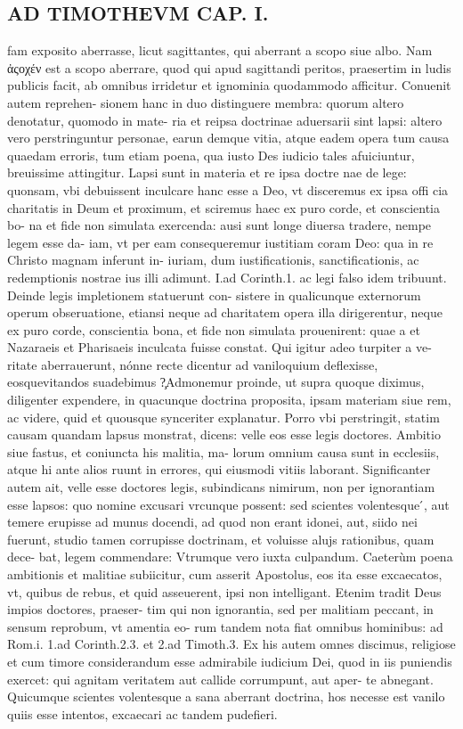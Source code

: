\documentclass{article}
\begin{document}
\begin{pages}
\section*{AD TIMOTHEVM CAP. I. }
\marginpar{[ p.24 ]}\pstart fam exposito aberrasse, licut sagittantes, qui aberrant a scopo siue albo. Nam ἀςοχέν est a scopo aberrare, quod qui apud sagittandi peritos, praesertim in ludis publicis facit, ab omnibus irridetur et ignominia quodammodo afficitur. Conuenit autem reprehen- sionem hanc in duo distinguere membra: quorum altero denotatur, quomodo in mate- ria et reipsa doctrinae aduersarii sint lapsi: altero vero perstringuntur personae, earun demque  vitia, atque  eadem opera tum causa quaedam erroris, tum etiam poena, qua iusto Des iudicio tales afuiciuntur, breuissime attingitur. Lapsi sunt in materia et re ipsa doctre nae de lege: quonsam, vbi debuissent inculcare hanc esse a Deo, vt disceremus ex ipsa offi cia charitatis in Deum et proximum, et sciremus haec ex puro corde, et conscientia bo- na et fide non simulata exercenda: ausi sunt longe diuersa tradere, nempe legem esse da- iam, vt per eam consequeremur iustitiam coram Deo: qua in re Christo magnam inferunt in- iuriam, dum iustificationis, sanctificationis, ac redemptionis nostrae ius illi adimunt. I.ad Corinth.1. ac legi falso idem tribuunt. Deinde legis impletionem statuerunt con- sistere in qualicunque  externorum operum obseruatione, etiansi neque  ad charitatem opera illa dirigerentur, neque  ex puro corde, conscientia bona, et fide non simulata prouenirent: quae a et Nazaraeis et Pharisaeis inculcata fuisse constat. Qui igitur adeo turpiter a ve- ritate aberrauerunt, nónne recte dicentur ad vaniloquium deflexisse, eosquevitandos suadebimus ?̧Admonemur proinde, ut supra quoque  diximus, diligenter expendere, in quacunque  doctrina proposita, ipsam materiam siue rem, ac videre, quid et quousque  synceriter explanatur. Porro vbi perstringit, statim causam quandam lapsus monstrat, dicens: velle eos esse legis doctores. Ambitio siue fastus, et coniuncta his malitia, ma- lorum omnium causa sunt in ecclesiis, atque  hi ante alios ruunt in errores, qui eiusmodi vitiis laborant. Significanter autem ait, velle esse doctores legis, subindicans nimirum, non per ignorantiam esse lapsos: quo nomine excusari vrcunque  possent: sed scientes volentesque ́, aut temere erupisse ad munus docendi, ad quod non erant idonei, aut, siido nei fuerunt, studio tamen corrupisse doctrinam, et voluisse alujs rationibus, quam dece- bat, legem commendare: Vtrumque  vero iuxta culpandum. Caeterùm poena ambitionis et malitiae subiicitur, cum asserit Apostolus, eos ita esse excaecatos, vt, quibus de rebus, et quid asseuerent, ipsi non intelligant. Etenim tradit Deus impios doctores, praeser- tim qui non ignorantia, sed per malitiam peccant, in sensum reprobum, vt amentia eo- rum tandem nota fiat omnibus hominibus: ad Rom.i. 1.ad Corinth.2.3. et 2.ad Timoth.3. Ex his autem omnes discimus, religiose et cum timore considerandum esse admirabile iudicium Dei, quod in iis puniendis exercet: qui agnitam veritatem aut callide corrumpunt, aut aper- te abnegant. Quicumque  scientes volentesque  a sana aberrant doctrina, hos necesse est vanilo quiis esse intentos, excaecari ac tandem pudefieri. 
\end{pages}
\end{document}
